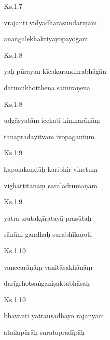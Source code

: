 \documentclass{tufte-handout}
\newenvironment{sanskrit}%
{\begin{otherlanguage}{sanskrit-devanagari}}%
{\end{otherlanguage}}
\begin{document}
    
	\begin{sanskrit}
	
	    
		Ks.1.7 
    
	    
		vrajanti vidyādharasundarīṇām 
    
	    
		anaṅgalekhakriyayopayogam 
    
	\end{sanskrit}

    
	\begin{sanskrit}
	
	    
		Ks.1.8 
    
	    
		yaḥ pūrayan kīcakarandhrabhāgān 
    
	    
		darīmukhotthena samīraṇena 
    
	\end{sanskrit}

    
	\begin{sanskrit}
	
	    
		Ks.1.8 
    
	    
		udgāsyatām icchati kiṃnarāṇāṃ 
    
	    
		tānapradāyitvam ivopagantum 
    
	\end{sanskrit}

    
	\begin{sanskrit}
	
	    
		Ks.1.9 
    
	    
		kapolakaṇḍūḥ karibhir vinetuṃ 
    
	    
		vighaṭṭitānāṃ saraladrumāṇām 
    
	\end{sanskrit}

    
	\begin{sanskrit}
	
	    
		Ks.1.9 
    
	    
		yatra srutakṣīratayā prasūtaḥ 
    
	    
		sānūni gandhaḥ surabhīkaroti 
    
	\end{sanskrit}

    
	\begin{sanskrit}
	
	    
		Ks.1.10 
    
	    
		vanecarāṇāṃ vanitāsakhānāṃ 
    
	    
		darīgṛhotsaṅganiṣaktabhāsaḥ 
    
	\end{sanskrit}

    
	\begin{sanskrit}
	
	    
		Ks.1.10 
    
	    
		bhavanti yatrauṣadhayo rajanyām 
    
	    
		atailapūrāḥ suratapradīpāḥ 
    
	\end{sanskrit}
\end{document}
